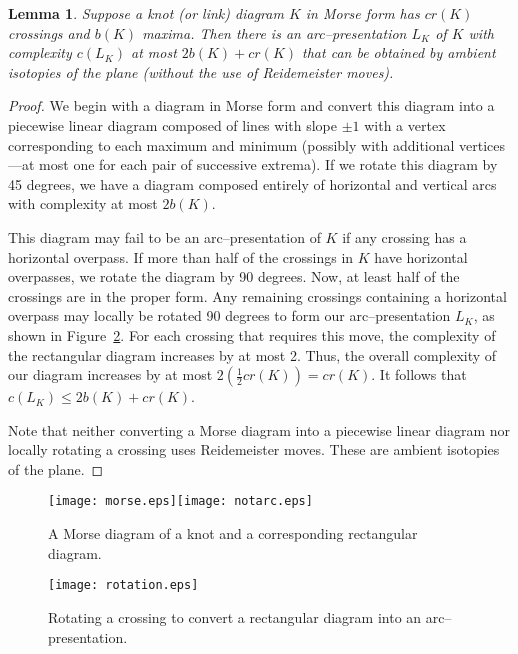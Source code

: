 \documentclass{amsart}
\newtheorem{lemma}[theorem]{Lemma}
\begin{document}
\begin{lemma}\label{arclemma}
Suppose a knot (or link) diagram $K$ in Morse form has $cr(K)$ crossings and $b(K)$ maxima. Then there is an arc--presentation $L_K$ of $K$ with complexity $c(L_K)$ at most $2b(K)+cr(K)$ that can be obtained by ambient isotopies of the plane (without the use of Reidemeister moves).
\end{lemma}
\begin{proof}
We begin with a diagram in Morse form and convert this diagram into a piecewise linear diagram composed of lines with slope $\pm1$ with a vertex corresponding to each maximum and minimum (possibly with additional vertices---at most one for each pair of successive extrema). If we rotate this diagram by 45 degrees, we have a diagram composed entirely of horizontal and vertical arcs with complexity at most $2b(K)$. 

This diagram may fail to be an arc--presentation of $K$ if any crossing has a horizontal overpass. If more than half of the crossings in $K$ have horizontal overpasses, we rotate the diagram by 90 degrees. Now, at least half of the crossings are in the proper form. Any remaining crossings containing a horizontal overpass may locally be rotated 90 degrees to form our arc--presentation $L_K$, as shown in Figure~\ref{rotation}. For each crossing that requires this move, the complexity of the rectangular diagram increases by at most 2. Thus, the overall complexity of our diagram increases by at most $2(\frac{1}{2}cr(K))=cr(K)$. It follows that $c(L_K)\leq 2b(K)+cr(K)$.  

Note that neither converting a Morse diagram into a piecewise linear diagram nor locally rotating a crossing uses Reidemeister moves. These are ambient isotopies of the plane.
\end{proof}

\begin{figure}[h]
\begin{center}
\texttt{[image: morse.eps]}\texttt{[image: notarc.eps]}
\end{center}
\caption{ \small{A Morse diagram of a knot and a corresponding rectangular diagram.}}
\label{morse}
\end{figure}

\begin{figure}[h]
\begin{center}
\texttt{[image: rotation.eps]}
\end{center}
\caption{ \small{Rotating a crossing to convert a rectangular diagram into an arc--presentation.}}
\label{rotation}
\end{figure}
\end{document}
